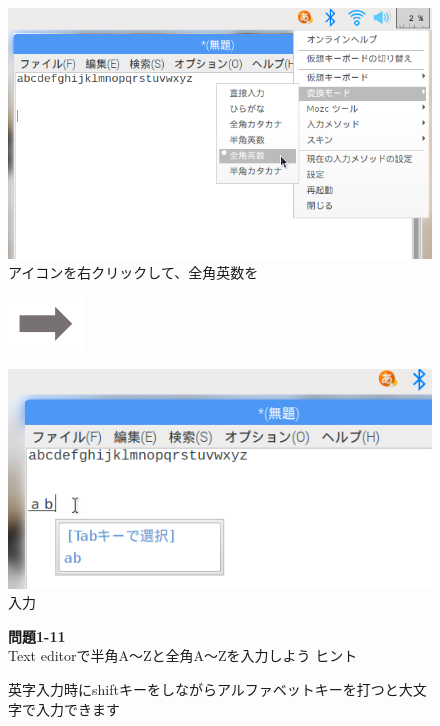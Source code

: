 \begin{figure}
  \begin{minipage}{0.3\textwidth}
    \includegraphics[width=\linewidth]{text01-img/textbook-img069.png}
     アイコンを右クリックして、全角英数を
  \end{minipage}
  \includegraphics[width=2cm]{text01-img/textbook-img073.png}
  \begin{minipage}{0.3\textwidth}
    \includegraphics[width=\linewidth]{text01-img/textbook-img070.png}
     入力
  \end{minipage}

  \vspace{3mm}
  \begin{minipage}{\textwidth}
    {\centering\textbf{\color{red}{
      プログラミングでアルファベット,記号を入力するときは
      半角(小さい文字)で入力しましょう}}
    }
  \end{minipage}

  \flushleft
  \noindent \textbf{問題1-11}\\
  Text editorで半角A〜Zと全角A〜Zを入力しよう
  ヒント

  英字入力時にshiftキーをしながらアルファベットキーを打つと大文字で入力できます

\end{figure}
\clearpage



